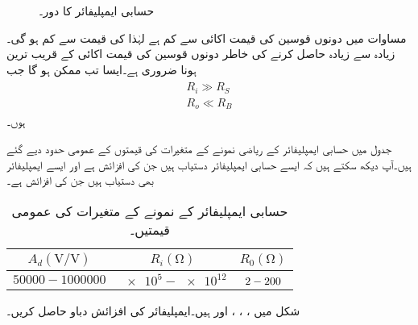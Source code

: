 \begin{figure}
\centering
{}
\caption{حسابی ایمپلیفائر کا دور۔}
\label{شکل_حسابی_ایمپلیفائر_دور_الف}
\end{figure}

مساوات  میں دونوں قوسین کی قیمت اکائی سے کم ہے لہٰذا  کی قیمت  سے کم ہو گی۔زیادہ سے زیادہ  حاصل کرنے کی خاطر دونوں قوسین کی قیمت اکائی کے قریب ترین ہونا ضروری ہے۔ایسا تب ممکن ہو گا جب
\begin{gather}
\begin{aligned}
R_i \gg R_S\\
R_o \ll R_B
\end{aligned}
\end{gather}
ہوں۔

جدول  میں حسابی ایمپلیفائر کے ریاضی نمونے کے متغیرات کی قیمتوں کے عمومی حدود دیے گئے ہیں۔آپ دیکھ سکتے ہیں کہ ایسے حسابی ایمپلیفائر دستیاب ہیں جن کی افزائش   ہے اور ایسے ایمپلیفائر بھی دستیاب ہیں جن کی افزائش  ہے۔
\begin{table} 
\caption{حسابی ایمپلیفائر کے نمونے کے متغیرات کی عمومی قیمتیں۔}
\centering
\begin{tabular}{ccc}
 $A_d (\si{\volt\per\volt})$ & $R_i (\si{\ohm})$ & $R_0 (\si{\ohm}) $\\
\hline
$\num{50000} - \num{1000000} $& $\num{e5} - \num{e12}$ & $2-200 \rule{0pt}{2.5ex} $ 
\end{tabular}
\label{جدول_حسابی_نمونہ_متغیرات}
\end{table}

شکل  میں ، ، ،  اور  ہیں۔ایمپلیفائر کی افزائش دباو  حاصل کریں۔

